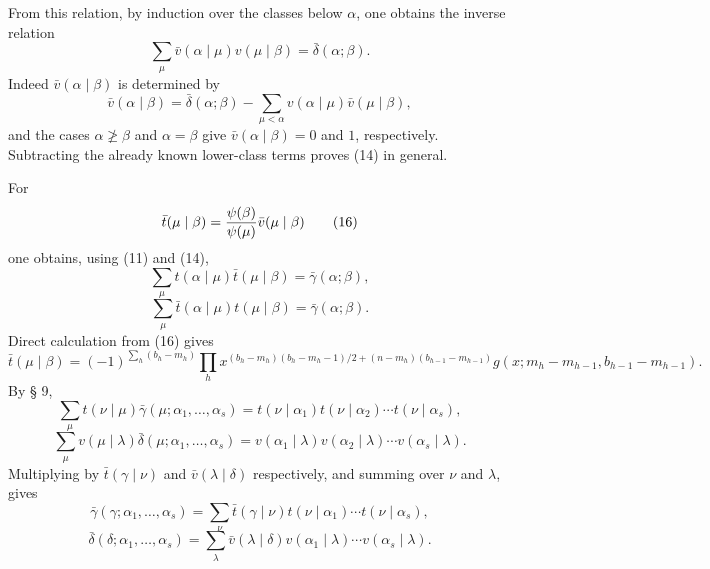From this relation, by induction over the classes below $\alpha$, one obtains the inverse relation
\begin{equation}
 \sum_\mu\bar v(\alpha\mid\mu)v(\mu\mid\beta)=\bar\delta(\alpha;\beta).
\tag{14}
\end{equation}
Indeed $\bar v(\alpha\mid\beta)$ is determined by
\begin{equation}
 \bar v(\alpha\mid\beta)=\bar\delta(\alpha;\beta)
 -\sum_{\mu<\alpha}v(\alpha\mid\mu)\bar v(\mu\mid\beta),
\tag{13}
\end{equation}
and the cases $\alpha\not\ge\beta$ and $\alpha=\beta$ give $\bar v(\alpha\mid\beta)=0$ and $1$, respectively. Subtracting the already known lower-class terms proves (14) in general.

For
\begin{equation}
 \bar t(\mu\mid\beta)={\psi(\beta)\over\psi(\mu)}\bar v(\mu\mid\beta)
\tag{16}
\end{equation}
one obtains, using (11) and (14),
\begin{equation}
 \sum_\mu t(\alpha\mid\mu)\bar t(\mu\mid\beta)=\bar\gamma(\alpha;\beta),
\tag{17}
\end{equation}
\begin{equation}
 \sum_\mu\bar t(\alpha\mid\mu)t(\mu\mid\beta)=\bar\gamma(\alpha;\beta).
\tag{18}
\end{equation}
Direct calculation from (16) gives
\begin{equation}
 \bar t(\mu\mid\beta)=(-1)^{\sum_h(b_h-m_h)}
 \prod_h x^{(b_h-m_h)(b_h-m_h-1)/2+(n-m_h)(b_{h-1}-m_{h-1})}
 g(x;m_h-m_{h-1},b_{h-1}-m_{h-1}).
\tag{19}
\end{equation}
By § 9,
\begin{equation}
 \sum_\mu t(\nu\mid\mu)\bar\gamma(\mu;\alpha_1,\ldots,\alpha_s)
 =t(\nu\mid\alpha_1)t(\nu\mid\alpha_2)\cdots t(\nu\mid\alpha_s),
\tag{20}
\end{equation}
\begin{equation}
 \sum_\mu v(\mu\mid\lambda)\bar\delta(\mu;\alpha_1,\ldots,\alpha_s)
 =v(\alpha_1\mid\lambda)v(\alpha_2\mid\lambda)\cdots v(\alpha_s\mid\lambda).
\tag{21}
\end{equation}
Multiplying by $\bar t(\gamma\mid\nu)$ and $\bar v(\lambda\mid\delta)$ respectively, and summing over $\nu$ and $\lambda$, gives
\begin{equation}
 \bar\gamma(\gamma;\alpha_1,
\ldots,\alpha_s)=\sum_\nu \bar t(\gamma\mid\nu)t(\nu\mid\alpha_1)\cdots t(\nu\mid\alpha_s),
\tag{22}
\end{equation}
\begin{equation}
 \bar\delta(\delta;\alpha_1,
\ldots,\alpha_s)=\sum_\lambda \bar v(\lambda\mid\delta)v(\alpha_1\mid\lambda)\cdots v(\alpha_s\mid\lambda).
\tag{23}
\end{equation}

